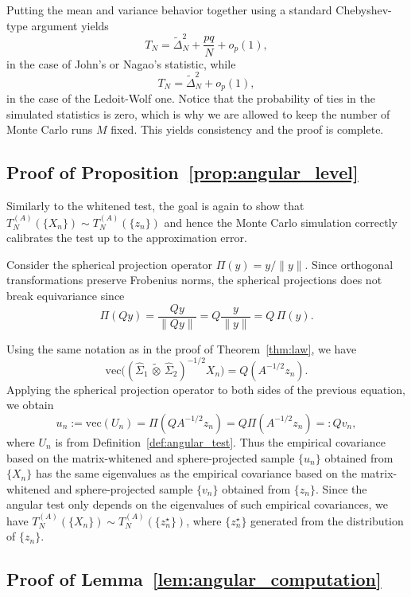 \documentclass[12pt]{article}
\renewcommand{\vec}{\mathrm{vec}}
\newcommand{\ot}{\,\tilde\otimes\,}
\newcommand{\mmle}{\widehat \Sigma_1 \ot \widehat \Sigma_2}
\begin{document}
Putting the mean and variance behavior together using a standard Chebyshev-type argument yields
\[
T_N = \widetilde\Delta_N^2 + \frac{pq}{N} + o_p(1),
\]
in the case of John's or Nagao's statistic, while
\[
T_N = \widetilde\Delta_N^2 + o_p(1),
\]
in the case of the Ledoit-Wolf one. Notice that the probability of ties in the simulated statistics is zero, which is why we are allowed to keep the number of Monte Carlo runs $M$ fixed. This yields consistency and the proof is complete.

\subsection{Proof of Proposition~\ref{prop:angular_level}}

Similarly to the whitened test, the goal is again to show that $T_N^{(A)}(\{X_n\}) \sim T_N^{(A)}(\{z_n\})$ and hence the Monte Carlo simulation correctly calibrates the test up to the approximation error.

Consider the spherical projection operator $\Pi(y) = y/\|y\|$. Since orthogonal transformations preserve Frobenius norms, the spherical projections does not break equivariance since
\[
\Pi(Qy) = \frac{Q y}{\|Qy\|}=Q \frac{y}{\|y\|} = Q\, \Pi(y).
\]

Using the same notation as in the proof of Theorem~\ref{thm:law}, we have
\[
\vec\big((\mmle)^{-1/2} X_n \big) = Q(A^{-1/2}z_n).
\]
Applying the spherical projection operator to both sides of the previous equation, we obtain
\[
u_n := \vec(U_n) = \Pi(Q A^{-1/2}z_n) = Q \Pi(A^{-1/2}z_n) =: Q v_n,
\]
where $U_n$ is from Definition~\ref{def:angular_test}. Thus the empirical covariance based on the matrix-whitened and sphere-projected sample $\{u_n\}$ obtained from $\{X_n\}$ has the same eigenvalues as the empirical covariance based on the matrix-whitened and sphere-projected sample $\{v_n\}$ obtained from $\{z_n\}$. Since the angular test only depends on the eigenvalues of such empirical covariances, we have $T_N^{(A)}(\{X_n\})\sim T_N^{(A)}(\{z_n^\star\})$, where $\{z_n^\star\}$ generated from the distribution of $\{z_n\}$.

\subsection{Proof of Lemma~\ref{lem:angular_computation}}
\end{document}
